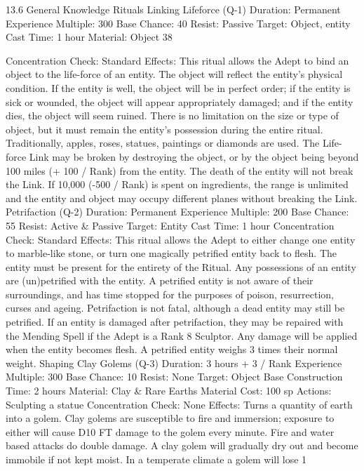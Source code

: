 \documentclass[a4paper]{article}
\begin{document}
\begin{multicols}{3}
13.6 General Knowledge Rituals
Linking Lifeforce (Q-1)
Duration: Permanent
Experience Multiple: 300
Base Chance: 40%
Resist: Passive
Target: Object, entity
Cast Time: 1 hour
Material: Object
38

Concentration Check: Standard
Effects: This ritual allows the Adept to bind an
object to the life-force of an entity. The object will
reflect the entity’s physical condition. If the entity
is well, the object will be in perfect order; if the
entity is sick or wounded, the object will appear
appropriately damaged; and if the entity dies, the
object will seem ruined. There is no limitation on
the size or type of object, but it must remain the
entity’s possession during the entire ritual. Traditionally, apples, roses, statues, paintings or diamonds are used. The Life-force Link may be broken by destroying the object, or by the object being
beyond 100 miles (+ 100 / Rank) from the entity.
The death of the entity will not break the Link. If
10,000 (-500 / Rank) is spent on ingredients, the
range is unlimited and the entity and object may
occupy different planes without breaking the Link.
Petrifaction (Q-2)
Duration: Permanent
Experience Multiple: 200
Base Chance: 55%
Resist: Active & Passive
Target: Entity
Cast Time: 1 hour
Concentration Check: Standard
Effects: This ritual allows the Adept to either
change one entity to marble-like stone, or turn one
magically petrified entity back to flesh. The entity
must be present for the entirety of the Ritual. Any
possessions of an entity are (un)petrified with the
entity. A petrified entity is not aware of their surroundings, and has time stopped for the purposes
of poison, resurrection, curses and ageing. Petrifaction is not fatal, although a dead entity may still be
petrified. If an entity is damaged after petrifaction,
they may be repaired with the Mending Spell if the
Adept is a Rank 8 Sculptor. Any damage will be
applied when the entity becomes flesh. A petrified
entity weighs 3 times their normal weight.
Shaping Clay Golems (Q-3)
Duration: 3 hours + 3 / Rank
Experience Multiple: 300
Base Chance: 10%
Resist: None
Target: Object
Base Construction Time: 2 hours
Material: Clay & Rare Earths Material Cost: 100
sp
Actions: Sculpting a statue
Concentration Check: None
Effects: Turns a quantity of earth into a golem.
Clay golems are susceptible to fire and immersion;
exposure to either will cause D10 FT damage to
the golem every minute. Fire and water based
attacks do double damage. A clay golem will
gradually dry out and become immobile if not kept
moist. In a temperate climate a golem will lose 1

\end{multicols}
\end{document}
